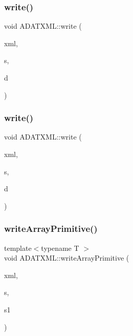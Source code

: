 \mbox{\label{namespaceADATXML_a858880833c586f87f16f2f3022243c16}} 
\subsubsection{\texorpdfstring{write()}{write()}\hspace{0.1cm}{\footnotesize\ttfamily [11/12]}}
{\footnotesize\ttfamily void A\+D\+A\+T\+X\+M\+L\+::write (\begin{DoxyParamCaption}\item[{\mbox{\hyperlink{classADATXML_1_1XMLWriter}{X\+M\+L\+Writer}} \&}]{xml,  }\item[{const string \&}]{s,  }\item[{const double \&}]{d }\end{DoxyParamCaption})}

\mbox{\label{namespaceADATXML_af41b23f17b1b37465f4c3ca3a115e87a}} 
\subsubsection{\texorpdfstring{write()}{write()}\hspace{0.1cm}{\footnotesize\ttfamily [12/12]}}
{\footnotesize\ttfamily void A\+D\+A\+T\+X\+M\+L\+::write (\begin{DoxyParamCaption}\item[{\mbox{\hyperlink{classADATXML_1_1XMLWriter}{X\+M\+L\+Writer}} \&}]{xml,  }\item[{const string \&}]{s,  }\item[{const bool \&}]{d }\end{DoxyParamCaption})}

\mbox{\label{namespaceADATXML_a6f40a822deea06e9a305fee4e7d89a17}} 
\subsubsection{\texorpdfstring{writeArrayPrimitive()}{writeArrayPrimitive()}}
{\footnotesize\ttfamily template$<$typename T $>$ \\
void A\+D\+A\+T\+X\+M\+L\+::write\+Array\+Primitive (\begin{DoxyParamCaption}\item[{\mbox{\hyperlink{classADATXML_1_1XMLWriter}{X\+M\+L\+Writer}} \&}]{xml,  }\item[{const std\+::string \&}]{s,  }\item[{const \mbox{\hyperlink{classXMLArray_1_1Array}{Array}}$<$ T $>$ \&}]{s1 }\end{DoxyParamCaption})}

